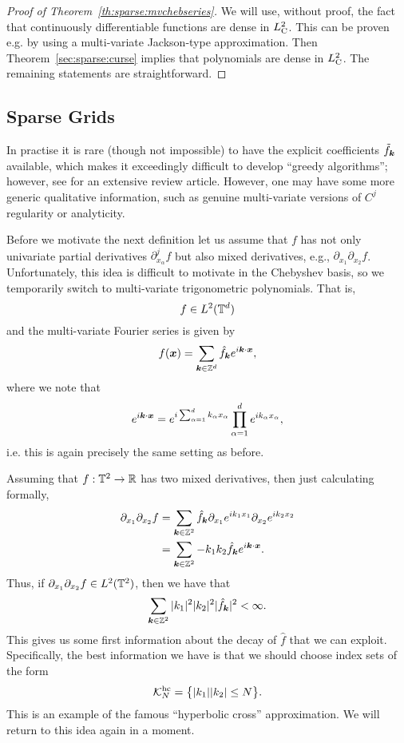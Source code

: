 \begin{proof}[Proof of Theorem~\ref{th:sparse:mvchebseries}] 
    We will use, without proof, the fact that continuously differentiable
    functions are dense in $L^2_{\rm C}$. This can be proven e.g. by using a
    multi-variate Jackson-type approximation. Then Theorem~\ref{sec:sparse:curse}
    implies that polynomials are dense in $L^2_{\rm C}$. The remaining 
    statements are straightforward. 
\end{proof}



\subsection{Sparse Grids}
%
\label{sec:sparse:sparse}
%
In practise it is rare (though not impossible) to have the explicit coefficients
$\tilde{f}_{\bm k}$ available, which makes it exceedingly difficult to develop
``greedy algorithms''; however, see \cite{DeVore1998-do} for an extensive review
article. However, one may have some more generic qualitative information, 
such as genuine multi-variate versions of $C^j$ regularity or analyticity.

Before we motivate the next definition let us assume that $f$ has not only
univariate partial derivatives $\partial_{x_\alpha}^j f$ but also mixed
derivatives, e.g., $\partial_{x_1} \partial_{x_2} f$. Unfortunately, this 
idea is difficult to motivate in the Chebyshev basis, so we temporarily 
switch to multi-variate trigonometric polynomials. That is, 
\[
    f \in L^2(\mathbb{T}^d)
\]
and the multi-variate Fourier series is given by 
\[
    f({\bm x}) = \sum_{{\bm k} \in \mathbb{Z}^d} \hat{f}_{\bm k} 
        e^{i {\bm k}\cdot {\bm x}},
\]
where we note that 
\[
    e^{i {\bm k}\cdot {\bm x}} =
    e^{i \sum_{\alpha = 1}^d k_\alpha x_\alpha}  
    \prod_{\alpha = 1}^d e^{i k_\alpha x_\alpha},
\]
i.e. this is again precisely the same setting as before. 

Assuming that $f : \mathbb{T}^2 \to \mathbb{R}$ has two mixed derivatives, then just
calculating formally, 
\begin{align*}
    \partial_{x_1} \partial_{x_2} f  
    &= 
    \sum_{{\bm k} \in \mathbb{Z}^2} \hat{f}_{\bm k} 
    \partial_{x_1} e^{ik_1x_1} \partial_{x_2} e^{ik_2x_2} \\ 
    &= 
    \sum_{{\bm k} \in \mathbb{Z}^2} - k_1 k_2 \hat{f}_{\bm k} 
    e^{i {\bm k} \cdot {\bm x}}.
\end{align*}
Thus, if $\partial_{x_1} \partial_{x_2} f  \in L^2(\mathbb{T}^2)$, then we have 
that 
\[
    \sum_{{\bm k} \in \mathbb{Z}^2} |k_1|^2 |k_2|^2 |\hat{f}_{{\bm k}}|^2 < \infty.
\]
This gives us some first information about the decay of $\hat{f}$ that we 
can exploit. Specifically, the best information we have is that we should choose 
index sets of the form 
\[
    \mathcal{K}_N^{\rm hc} =  \big\{ 
            |k_1| |k_2| \leq N \big\}.
\]
This is an example of the famous ``hyperbolic cross'' approximation. We will 
return to this idea again in a moment. 

